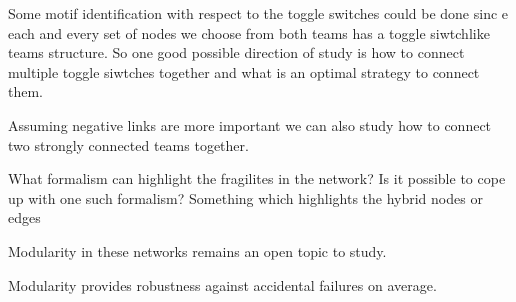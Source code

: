 \documentclass{article}
\begin{document}
Some motif identification with respect to the toggle switches could be done sinc e each and every set of nodes we choose from both teams has a toggle siwtchlike teams structure. So one good possible direction of study is how to connect multiple toggle siwtches together and what is an optimal strategy to connect them. 

Assuming negative links are more important we can also study how to connect two strongly connected teams together. 

What formalism can highlight the fragilites in the network? Is it possible to cope up with one such formalism? Something which highlights the hybrid nodes or edges


Modularity in these networks remains an open topic to study. 

Modularity provides robustness against accidental failures on average. 

\href{https://pdf.sciencedirectassets.com/311228/1-s2.0-S2001037019X00021/1-s2.0-S200103701930460X/main.pdf?X-Amz-Security-Token=IQoJb3JpZ2luX2VjEP%2F%2F%2F%2F%2F%2F%2F%2F%2F%2F%2FwEaCXVzLWVhc3QtMSJHMEUCIFF2OUeRg13UEjtFS4lMSubdZsb%2BEm9%2BLZcAc%2Facc6dfAiEAje2efCiaM%2BgciiEtjttD4OUXb2S3E099NXhU4ZBedzwqswUIeBAFGgwwNTkwMDM1NDY4NjUiDOh4OgYSBQGfuXOGzyqQBT%2F2%2BeTQwLd%2F159K0X2%2FXiJTld97tFGXa5CfpDgllOkwg6v9IGr5zL1p6g5nJJNxAF%2B7Djz6uaXq%2Blpfp4GjQkqCBAz9Nbh9RuwUdMWlU305uR4173GovgsPgwWXxBXAhl9fxUz9iXvgvC7fIJqLNq1%2BpFP9JqcLlq5WU86yawheNcFGoqKuaIexRdNz35roPGMK3fq%2Bq%2Fx%2BJps4CNKpmlO114uZgbm7hJCAJ%2FrQdV%2BsVKMwgpLcCx3mXvhUXcn2s%2Bhyz9fDVQFrD%2BCCXLQMNQogrkZx2dNzX6IK9cXMxfRr9Uogb7NNu5c8CigCwMkecQxUsPsDd3Jok330N1dOb0nNlF3cnUyx9oO9a1fWpAiSfsG%2F%2Bwf3Go4ih29VxnAalRNdxfRwOuBh%2Fg1uYJN4kDcyX%2Bir%2B3jZTYZweIth95taChNgkByCKzGacSUcVWzrFvwzqbK0MCxzBHcQnBm%2BCXf1RSgDT%2FM4JRdz%2FpL6sklUU0IeijkB7w22o%2BmMApzBJKH5hUpCEFBauB1S%2F3J%2FRmKwGEHKKFVaklSH3zE59rkrJFKp3RvRDglY1EWon9UCwVcwCa0fKd6LoFVtATHimw6e1dVmXPU8oBFqDh9ISVCM6KNthdLk5ATK1I3yKifcpIjklbXBls5lZZdoa0BoILbxznUcIyiHslVs7pBs2JuKVYyIldtqTsOTWk4FlY8FRu37%2Bj%2BGHntZr1PQRi6Vd5iHUDsov0f8ZzFMbgNTgk8M4zpjFQ1cxla2Z1LtYzivrO8vugP5BCT%2FrhEWwIzJWbzTi9Ti8wWIRSfHW7ijXOfc6DxiEuROxIp9N%2BfIvy6GKpWVYyBSz2ckXBwRt60IjN9yEHlWKArAJQRd5ksisg8jMMHtpaUGOrEBji%2Fpeuu5gHufZ%2BVY8fjNLML3yjEicDgL2erYaHbGmw%2FznXU5JAEQOJEcpGDOa%2FIriWkkAEEfSk8sZeUHIVsGzGGFSrQpGscSQ%2BJU3qJ3P0pOd1wHA1Tu6G4oTi2600FuHOTPNDKzK9dHcseEjebL4DXIvEvtVFCqe2aKv8ji125rvyttZS0AObvWiRQfsxn8FCFenARJeLypYoWY8qiKx08ECRa4MlVVwl8H9Jm%2FAIPo&X-Amz-Algorithm=AWS4-HMAC-SHA256&X-Amz-Date=20230708T161304Z&X-Amz-SignedHeaders=host&X-Amz-Expires=300&X-Amz-Credential=ASIAQ3PHCVTYYQV73QUT%2F20230708%2Fus-east-1%2Fs3%2Faws4_request&X-Amz-Signature=6d444aa7d6e5f6cb726cc87771f0900b65fd38d38bc88477826a7148602c522b&hash=4caa8d906ae9f40e3a5b0c2c3bc16761549edfb62c60dd6f58d287ea003976e3&host=68042c943591013ac2b2430a89b270f6af2c76d8dfd086a07176afe7c76c2c61&pii=S200103701930460X&tid=spdf-4b330740-2cf4-41b6-843b-ed1b0fd8cb1a&sid=04a3260d9acc7244b96b9897b49e1c69ae3bgxrqb&type=client&tsoh=d3d3LnNjaWVuY2VkaXJlY3QuY29t&ua=0f0d5902555b590c04&rr=7e399cc71e9eb29d&cc=in}{} 
\end{document}
